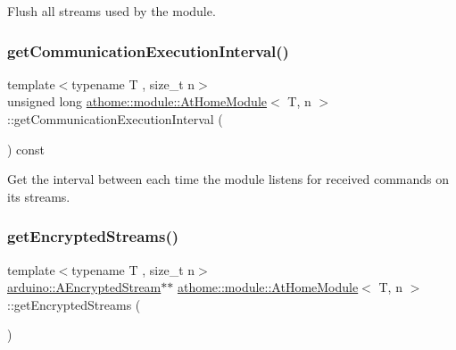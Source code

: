 Flush all streams used by the module. \mbox{\label{classathome_1_1module_1_1_at_home_module_a263fe0bea2fa480b3885fee07e2a8221}} 
\subsubsection{\texorpdfstring{get\+Communication\+Execution\+Interval()}{getCommunicationExecutionInterval()}}
{\footnotesize\ttfamily template$<$typename T , size\+\_\+t n$>$ \\
unsigned long \mbox{\hyperlink{classathome_1_1module_1_1_at_home_module}{athome\+::module\+::\+At\+Home\+Module}}$<$ T, n $>$\+::get\+Communication\+Execution\+Interval (\begin{DoxyParamCaption}{ }\end{DoxyParamCaption}) const\hspace{0.3cm}{\ttfamily [inline]}}

Get the interval between each time the module listens for received commands on its streams. \mbox{\label{classathome_1_1module_1_1_at_home_module_a1997a4cc4941fe2d81588785736c1cee}} 
\subsubsection{\texorpdfstring{get\+Encrypted\+Streams()}{getEncryptedStreams()}}
{\footnotesize\ttfamily template$<$typename T , size\+\_\+t n$>$ \\
\mbox{\hyperlink{classathome_1_1arduino_1_1_a_encrypted_stream}{arduino\+::\+A\+Encrypted\+Stream}}$\ast$$\ast$ \mbox{\hyperlink{classathome_1_1module_1_1_at_home_module}{athome\+::module\+::\+At\+Home\+Module}}$<$ T, n $>$\+::get\+Encrypted\+Streams (\begin{DoxyParamCaption}{ }\end{DoxyParamCaption})\hspace{0.3cm}{\ttfamily [inline]}}


